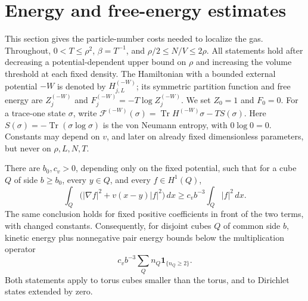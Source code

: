 \section{Energy and free-energy estimates}\label{sec:local-energy}\label{sec:energy}

This section gives the particle-number costs needed to localize the gas.
Throughout, $0<T\leq\rho^2$, $\beta=T^{-1}$, and
$\rho/2\leq N/V\leq2\rho$. All statements hold after decreasing a
potential-dependent upper bound on $\rho$ and increasing the volume
threshold at each fixed density. The Hamiltonian with a bounded external
potential $-W$ is denoted by $H_{j,L}^{(-W)}$; its symmetric partition
function and free energy are $Z_j^{(-W)}$ and
$F_j^{(-W)}=-T\log Z_j^{(-W)}$. We set $Z_0=1$ and $F_0=0$.
For a trace-one state $\sigma$, write
$\mathcal F^{(-W)}(\sigma)=\operatorname{Tr}H^{(-W)}\sigma-TS(\sigma)$.
Here $S(\sigma)=-\operatorname{Tr}(\sigma\log\sigma)$ is the
von Neumann entropy, with $0\log0=0$.
Constants may depend on $v$, and later on already fixed dimensionless
parameters, but never on $\rho,L,N,T$.

\begin{lemma}\label{lem:neumann-cell}
There are $b_0,c_v>0$, depending only on the fixed potential, such that
for a cube $Q$ of side $b\geq b_0$, every $y\in Q$, and every
$f\in H^1(Q)$,
\begin{equation}
 \int_Q\bigl(|\nabla f|^2+v(x-y)|f|^2\bigr)\,dx
 \geq c_v b^{-3}\int_Q|f|^2\,dx.\tag{1}\label{eq:1}
\end{equation}
The same conclusion holds for fixed positive coefficients in front of
the two terms, with changed constants. Consequently, for disjoint
cubes $Q$ of common side $b$, kinetic energy plus nonnegative pair
energy bounds below the multiplication operator
\begin{equation}
 c_v b^{-3}\sum_Q n_Q\mathbf1_{\{n_Q\geq2\}}.\tag{2}\label{eq:2}
\end{equation}
Both statements apply to torus cubes smaller than the torus, and to
Dirichlet states extended by zero.
\end{lemma}

